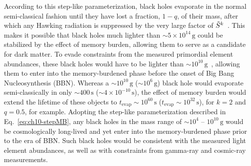 According to this step-like parameterization, black holes evaporate in the normal semi-classical fashion until they have lost a fraction, $1-q$, of their mass, after which any Hawking radiation is suppressed by the very large factor of $\Tilde{S}^{k}$~\cite{Dvali:2018xpy, Dvali:2018ytn, Dvali:2020wft}. This makes it possible that black holes much lighter than $\sim 5 \times 10^{14}\,\mathrm{g}$ could be stabilized by the effect of memory burden, allowing them to serve as a candidate for dark matter. To evade constraints from the measured primordial element abundances, these black holes would have to be lighter than $\sim 10^{10}\,\mathrm{g}$~\cite{Keith:2020jww,Haque:2024eyh}, allowing them to enter into the memory-burdened phase before the onset of Big Bang Nucleosynthesis (BBN). Whereas a $\sim 10^{10}\,\mathrm{g}$ ($\sim 10^{6}\,\mathrm{g}$) black hole would evaporate semi-classically in only $\sim 400\,\mathrm{s}$ ($\sim 4 \times 10^{-10}\,\mathrm{s}$), the effect of memory burden would extend the lifetime of these objects to $t_\mathrm{evap} \sim 10^{60}\,\mathrm{s}$ ($t_\mathrm{evap} \sim 10^{32}\,\mathrm{s}$), for $k=2$ and $q=0.5$, for example. Adopting the step-like parameterization described in Eq.~\eqref{eq:ch10-stepMB}, any black holes in the mass range of $\sim 10^{4}$ -- $10^{10}\,\mathrm{g}$ would be cosmologically long-lived and yet enter into the memory-burdened phase prior to the era of BBN. Such black holes would be consistent with the measured light element abundances, as well as with constraints from gamma-ray and cosmic-ray measurements.

